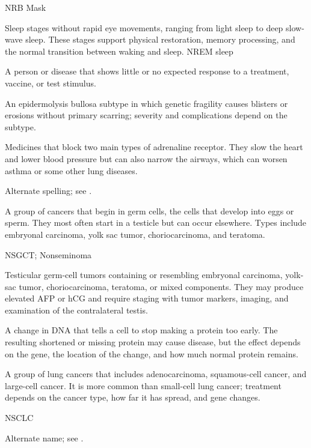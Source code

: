 \synonyms
NRB Mask

 Sleep stages without rapid eye movements, ranging from light sleep to deep slow-wave sleep. These stages support physical restoration, memory processing, and the normal transition between waking and sleep.
\synonyms
NREM sleep

 A person or disease that shows little or no expected response to a treatment, vaccine, or test stimulus.

 An epidermolysis bullosa subtype in which genetic fragility causes blisters or erosions without primary scarring; severity and complications depend on the subtype.

 Medicines that block two main types of adrenaline receptor. They slow the heart and lower blood pressure but can also narrow the airways, which can worsen asthma or some other lung diseases.

 Alternate spelling; see .

 A group of cancers that begin in germ cells, the cells that develop into eggs or sperm. They most often start in a testicle but can occur elsewhere. Types include embryonal carcinoma, yolk sac tumor, choriocarcinoma, and teratoma.

\synonyms
NSGCT; Nonseminoma

 Testicular germ-cell tumors containing or resembling embryonal carcinoma, yolk-sac tumor, choriocarcinoma, teratoma, or mixed components. They may produce elevated AFP or hCG and require staging with tumor markers, imaging, and examination of the contralateral testis.

 A change in DNA that tells a cell to stop making a protein too early. The resulting shortened or missing protein may cause disease, but the effect depends on the gene, the location of the change, and how much normal protein remains.

 A group of lung cancers that includes adenocarcinoma, squamous-cell cancer, and large-cell cancer. It is more common than small-cell lung cancer; treatment depends on the cancer type, how far it has spread, and gene changes.

\synonyms
NSCLC

 Alternate name; see .

